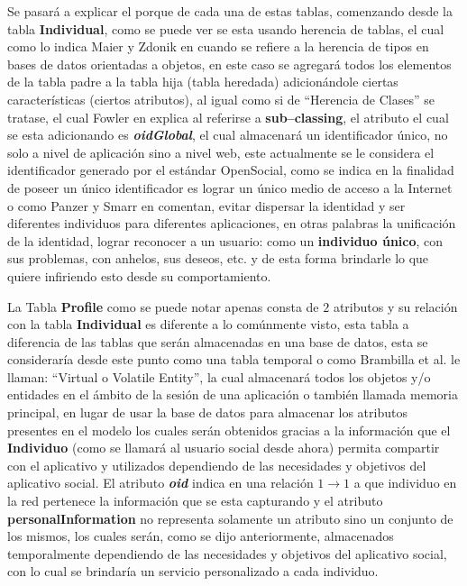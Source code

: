 \documentclass[oneside,12pt,a4paper]{memoir}%
\begin{document}
		Se pasar\'a a explicar el porque de cada una de estas tablas, comenzando desde
		la tabla \textbf{Individual}, como se puede ver se esta usando herencia de
		tablas, el cual como lo indica Maier y Zdonik en \cite{Zdonik1990} cuando se
		refiere a la herencia de tipos en bases de datos orientadas a objetos, en este
		caso se agregar\'a todos los elementos de la tabla padre a la tabla hija
		(tabla heredada) adicion\'andole ciertas caracter\'isticas (ciertos
		atributos), al igual como si de ``Herencia de Clases'' se tratase, el cual
		Fowler en \cite{Fowler2003} explica al referirse a \textbf{sub--classing}, el
		atributo el cual se esta adicionando es \textit{\textbf{oidGlobal}}, el cual
		almacenar\'a un identificador \'unico, no solo a nivel de aplicaci\'on sino a
		nivel web, este actualmente se le considera el identificador generado por el
		est\'andar OpenSocial, como se indica en \cite{OpenSocial} la finalidad de
		poseer un \'unico identificador es lograr un \'unico medio de acceso a la
		Internet o como Panzer y Smarr en \cite{Smarr2010} comentan, evitar dispersar
		la identidad y ser diferentes individuos para diferentes aplicaciones, en
		otras palabras la unificaci\'on de la identidad, lograr reconocer a un
		usuario: como un \textbf{individuo \'unico}, con sus problemas, con anhelos,
		sus deseos, etc. y de esta forma brindarle lo que quiere infiriendo esto desde
		su comportamiento.
		
		La Tabla \textbf{Profile} como se puede notar apenas consta de $2$ atributos y
		su relaci\'on con la tabla \textbf{Individual} es diferente a lo com\'unmente
		visto, esta tabla a diferencia de las tablas que ser\'an almacenadas en una
		base de datos, esta se considerar\'ia desde este punto como una tabla temporal
		o como Brambilla et al. \cite{Brambilla2003} le llaman: ``Virtual o Volatile
		Entity'', la cual almacenar\'a todos los objetos y/o entidades en el \'ambito de la
		sesi\'on de una aplicaci\'on o tambi\'en llamada memoria principal, en lugar de usar la
		base de datos para almacenar los atributos presentes en el modelo los cuales
		ser\'an obtenidos gracias a la informaci\'on que el \textbf{Individuo} (como
		se llamar\'a al usuario social desde ahora) permita compartir con el
		aplicativo y utilizados dependiendo de las necesidades y objetivos del
		aplicativo social.
		El atributo \textbf{\textit{oid}} indica en una relaci\'on $1 \to 1$ a que
		individuo en la red pertenece la informaci\'on que se esta capturando y el
		atributo \textbf{personalInformation} no representa solamente un atributo
		sino un conjunto de los mismos, los cuales ser\'an, como se dijo
		anteriormente, almacenados temporalmente dependiendo de las necesidades y objetivos del
		aplicativo social, con lo cual se brindar\'ia un servicio personalizado a cada
		individuo.
		
\end{document}
